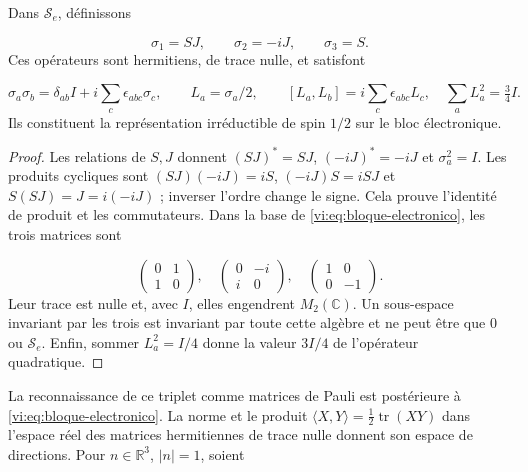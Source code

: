 \begin{proposition}
\label{vi:prop:spin}
Dans $\mathscr S_e$, définissons

\begin{equation}
 \sigma_1=SJ,\qquad \sigma_2=-iJ,\qquad \sigma_3=S.
 \label{vi:eq:terna}
\end{equation}
Ces opérateurs sont hermitiens, de trace nulle, et satisfont

\begin{equation}
 \sigma_a\sigma_b=\delta_{ab}I+
 i\sum_c\epsilon_{abc}\sigma_c,
 \qquad L_a=\sigma_a/2,\qquad
 [L_a,L_b]=i\sum_c\epsilon_{abc}L_c,
 \quad\sum_aL_a^2=\tfrac34I.
 \label{vi:eq:spin-algebra}
\end{equation}
Ils constituent la représentation irréductible de spin $1/2$ sur
le bloc électronique.

\end{proposition}
\begin{proof}
Les relations de $S,J$ donnent $(SJ)^*=SJ$, $(-iJ)^*=-iJ$ et
$\sigma_a^2=I$. Les produits cycliques sont
$(SJ)(-iJ)=iS$, $(-iJ)S=iSJ$ et $S(SJ)=J=i(-iJ)$ ;
inverser l’ordre change le signe. Cela prouve l’identité de
produit et les commutateurs. Dans la base de
\eqref{vi:eq:bloque-electronico}, les trois matrices sont

\[
 \begin{pmatrix}0&1\\1&0\end{pmatrix},\quad
 \begin{pmatrix}0&-i\\i&0\end{pmatrix},\quad
 \begin{pmatrix}1&0\\0&-1\end{pmatrix}.
\]
Leur trace est nulle et, avec $I$, elles engendrent $M_2(\mathbb C)$.
Un sous-espace invariant par les trois est invariant par toute cette
algèbre et ne peut être que $0$ ou $\mathscr S_e$. Enfin,
sommer $L_a^2=I/4$ donne la valeur $3I/4$ de l’opérateur quadratique.

\end{proof}

La reconnaissance de ce triplet comme matrices de Pauli est postérieure
à \eqref{vi:eq:bloque-electronico}. La norme et le produit
$\langle X,Y\rangle=\tfrac12\operatorname{tr}(XY)$ dans
l’espace réel des matrices hermitiennes de trace nulle donnent son espace
de directions. Pour $n\in\mathbb R^3$, $|n|=1$, soient

